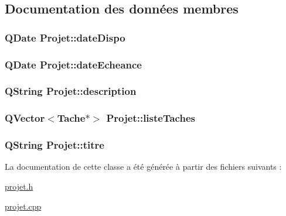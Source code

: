 \subsection{Documentation des données membres}
\hypertarget{class_projet_a8a89803d629bb571062921008e6a2639}{}
\subsubsection[{date\+Dispo}]{\setlength{\rightskip}{0pt plus 5cm}Q\+Date Projet\+::date\+Dispo\hspace{0.3cm}{\ttfamily [private]}}\label{class_projet_a8a89803d629bb571062921008e6a2639}
\hypertarget{class_projet_a868ee370bb8f071b830dda61f55d99cd}{}
\subsubsection[{date\+Echeance}]{\setlength{\rightskip}{0pt plus 5cm}Q\+Date Projet\+::date\+Echeance\hspace{0.3cm}{\ttfamily [private]}}\label{class_projet_a868ee370bb8f071b830dda61f55d99cd}
\hypertarget{class_projet_ac2e3a37d5f0201390991b97f258ce0eb}{}
\subsubsection[{description}]{\setlength{\rightskip}{0pt plus 5cm}Q\+String Projet\+::description\hspace{0.3cm}{\ttfamily [private]}}\label{class_projet_ac2e3a37d5f0201390991b97f258ce0eb}
\hypertarget{class_projet_a268bc6fc9be6d5e266439cc6371cd617}{}
\subsubsection[{liste\+Taches}]{\setlength{\rightskip}{0pt plus 5cm}Q\+Vector$<${\bf Tache}$\ast$$>$ Projet\+::liste\+Taches\hspace{0.3cm}{\ttfamily [private]}}\label{class_projet_a268bc6fc9be6d5e266439cc6371cd617}
\hypertarget{class_projet_a9759849c856c2ac63f94751b876fd289}{}
\subsubsection[{titre}]{\setlength{\rightskip}{0pt plus 5cm}Q\+String Projet\+::titre\hspace{0.3cm}{\ttfamily [private]}}\label{class_projet_a9759849c856c2ac63f94751b876fd289}


La documentation de cette classe a été générée à partir des fichiers suivants \+:\begin{DoxyCompactItemize}
\item 
\hyperlink{projet_8h}{projet.\+h}\item 
\hyperlink{projet_8cpp}{projet.\+cpp}\end{DoxyCompactItemize}
